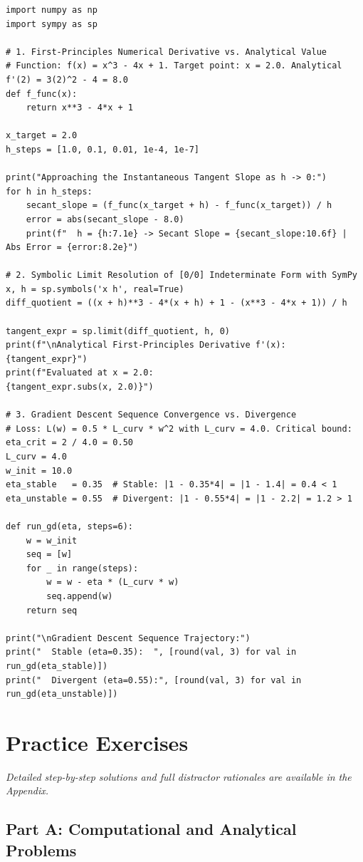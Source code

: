 \begin{lstlisting}[caption={Numerical Secants, First-Principles Tangents, and GD Convergence in Python}]
import numpy as np
import sympy as sp

# 1. First-Principles Numerical Derivative vs. Analytical Value
# Function: f(x) = x^3 - 4x + 1. Target point: x = 2.0. Analytical f'(2) = 3(2)^2 - 4 = 8.0
def f_func(x):
    return x**3 - 4*x + 1

x_target = 2.0
h_steps = [1.0, 0.1, 0.01, 1e-4, 1e-7]

print("Approaching the Instantaneous Tangent Slope as h -> 0:")
for h in h_steps:
    secant_slope = (f_func(x_target + h) - f_func(x_target)) / h
    error = abs(secant_slope - 8.0)
    print(f"  h = {h:7.1e} -> Secant Slope = {secant_slope:10.6f} | Abs Error = {error:8.2e}")

# 2. Symbolic Limit Resolution of [0/0] Indeterminate Form with SymPy
x, h = sp.symbols('x h', real=True)
diff_quotient = ((x + h)**3 - 4*(x + h) + 1 - (x**3 - 4*x + 1)) / h

tangent_expr = sp.limit(diff_quotient, h, 0)
print(f"\nAnalytical First-Principles Derivative f'(x): {tangent_expr}")
print(f"Evaluated at x = 2.0:                         {tangent_expr.subs(x, 2.0)}")

# 3. Gradient Descent Sequence Convergence vs. Divergence
# Loss: L(w) = 0.5 * L_curv * w^2 with L_curv = 4.0. Critical bound: eta_crit = 2 / 4.0 = 0.50
L_curv = 4.0
w_init = 10.0
eta_stable   = 0.35  # Stable: |1 - 0.35*4| = |1 - 1.4| = 0.4 < 1
eta_unstable = 0.55  # Divergent: |1 - 0.55*4| = |1 - 2.2| = 1.2 > 1

def run_gd(eta, steps=6):
    w = w_init
    seq = [w]
    for _ in range(steps):
        w = w - eta * (L_curv * w)
        seq.append(w)
    return seq

print("\nGradient Descent Sequence Trajectory:")
print("  Stable (eta=0.35):  ", [round(val, 3) for val in run_gd(eta_stable)])
print("  Divergent (eta=0.55):", [round(val, 3) for val in run_gd(eta_unstable)])
\end{lstlisting}

\newpage
\section{Practice Exercises}
\textit{Detailed step-by-step solutions and full distractor rationales are available in the Appendix.}

\subsection*{Part A: Computational and Analytical Problems}

